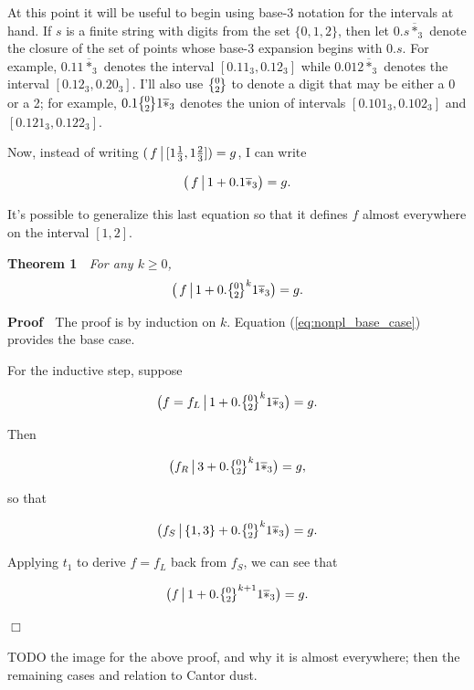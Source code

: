 \documentclass[]{article}
\begin{document}
\newcommand{\zerotwo}{\big\{\!\raise1.5pt\hbox{$\genfrac{}{}{0pt}{}
{\lower1.8pt\hbox{$\smash{\scriptstyle 0}$}}
{\lower1pt\hbox{$\smash{\scriptstyle 2}$}}$}\!\big\}}

\newcommand{\lstar}{\overline{*}_3}

At this point it will be useful to begin using base-3 notation for the
intervals at hand. If \(s\) is a finite string with digits from the set
\(\{0, 1, 2\}\), then let \(0.s\lstar\) denote the closure of the set of
points whose base-3 expansion begins with \(0.s\). For example,
\(0.11\lstar\) denotes the interval \([0.11_3, 0.12_3]\) while
\(0.012\lstar\) denotes the interval \([0.12_3, 0.20_3]\). I'll also use
\(\zerotwo\) to denote a digit that may be either a 0 or a 2; for
example, \(0.1\zerotwo 1\lstar\) denotes the union of intervals
\([0.101_3, 0.102_3]\) and \([0.121_3, 0.122_3]\).

Now, instead of writing
\((\,f \,\big|\, [1\tfrac{1}{3}, 1\tfrac{2}{3}]) = g\), I can write

\begin{equation}\big(\,f \restrict 1 + 0.1\lstar\big) = g.\label{eq:nonpl_base_case}\end{equation}

It's possible to generalize this last equation so that it defines \(f\)
almost everywhere on the interval \([1, 2]\).

\textbf{Theorem 1} \(\;\) \emph{For any \(k\ge 0\),
\[\big(\,f \restrict 1 + 0.\zerotwo^k1\lstar\big)=g.\]}

\textbf{Proof} \(\;\) The proof is by induction on \(k\). Equation
(\ref{eq:nonpl_base_case}) provides the base case.

For the inductive step, suppose

\[\big(f=f_L \restrict 1 + 0.\zerotwo^k1\lstar \big) = g.\]

Then

\[\big(f_R \restrict 3 + 0.\zerotwo^k1\lstar \big) = g,\]

so that

\[\big(f_S \restrict \{1,3\} + 0.\zerotwo^k1\lstar \big) = g.\]

Applying \(t_1\) to derive \(f=f_L\) back from \(f_S\), we can see that

\[\big(f \restrict 1 + 0.\zerotwo^{k+1}1\lstar \big) = g.\]

\hfill\(\Box\)

TODO the image for the above proof, and why it is almost everywhere;
then the remaining cases and relation to Cantor dust.
\end{document}
